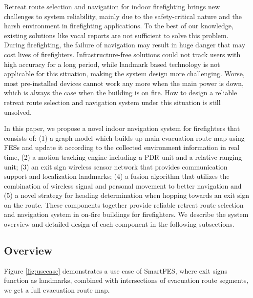 \documentclass[conference]{IEEEtran}
\begin{document}
Retreat route selection and navigation for indoor firefighting brings new challenges to system reliability, mainly due to the safety-critical nature and the harsh environment in firefighting applications. To the best of our knowledge, existing solutions like vocal reports are not sufficient to solve this problem. During firefighting, the failure of navigation may result in huge danger that may cost lives of firefighters. Infrastructure-free solutions could not track users with high accuracy for a long period, while landmark based technology is not applicable for this situation, making the system design more challenging. Worse, most pre-installed devices cannot work any more when the main power is down, which is always the case when the building is on fire. How to design a reliable retreat route selection and navigation system under this situation is still unsolved.

In this paper, we propose a novel indoor navigation system for firefighters that consists of: (1) a graph model which builds up main evacuation route map using FESs and update it according to the collected environment information in real time, (2) a motion tracking engine including a PDR unit and a relative ranging unit; (3) an exit sign wireless sensor network that provides communication support and localization landmarks; (4) a fusion algorithm that utilizes the combination of wireless signal and personal movement to better navigation and (5) a novel strategy for heading determination when hopping towards an exit sign on the route.
These components together provide reliable retreat route selection and navigation system in on-fire buildings for firefighters. We describe the system overview and detailed design of each component in the following subsections.

  \subsection{Overview}

      
    Figure \ref{fig:usecase} demonstrates a use case of SmartFES, where exit signs function as landmarks, combined with intersections of evacuation route segments, we get a full evacuation route map.
\end{document}
